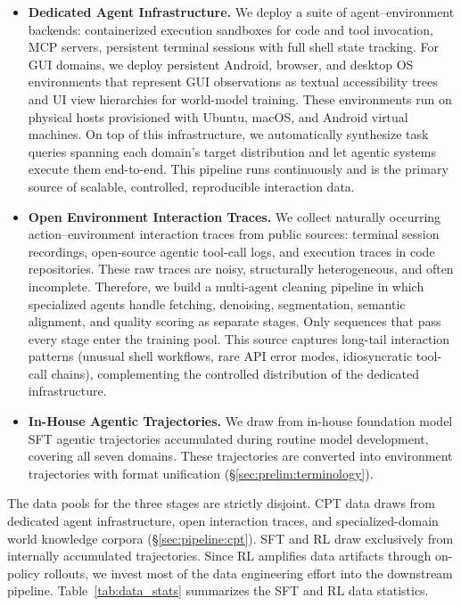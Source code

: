 \begin{itemize}[leftmargin=1.5em,itemsep=2pt]
\item \textbf{Dedicated Agent Infrastructure.}
We deploy a suite of agent--environment backends: containerized execution sandboxes for code and tool invocation, MCP servers, persistent terminal sessions with full shell state tracking.
For GUI domains, we deploy persistent Android, browser, and desktop OS environments that represent GUI observations as textual accessibility trees and UI view hierarchies for world-model training. These environments run on physical hosts provisioned with Ubuntu, macOS, and Android virtual machines.
On top of this infrastructure, we automatically synthesize task queries spanning each domain's target distribution and let agentic systems execute them end-to-end.
This pipeline runs continuously and is the primary source of scalable, controlled, reproducible interaction data.

\item \textbf{Open Environment Interaction Traces.}
We collect naturally occurring action--environment interaction traces from public sources:
terminal session recordings,
open-source agentic tool-call logs, and execution traces in code repositories.
These raw traces are noisy, structurally heterogeneous, and often incomplete.
Therefore, we build a multi-agent cleaning pipeline in which specialized agents handle fetching, denoising, segmentation, semantic alignment, and quality scoring as separate stages.
Only sequences that pass every stage enter the training pool.
This source captures long-tail interaction patterns (unusual shell workflows, rare API error modes, idiosyncratic tool-call chains), complementing the controlled distribution of the dedicated infrastructure.

\item \textbf{In-House Agentic Trajectories.}
We draw from in-house foundation model SFT agentic trajectories accumulated during routine model development, covering all seven domains.
These trajectories are converted into environment trajectories with format unification (\S\ref{sec:prelim:terminology}).
\end{itemize}

The data pools for the three stages are strictly disjoint.
CPT data draws from dedicated agent infrastructure, open interaction traces, and specialized-domain world knowledge corpora (\S\ref{sec:pipeline:cpt}).
SFT and RL draw exclusively from internally accumulated trajectories.
Since RL amplifies data artifacts through on-policy rollouts, we invest most of the data engineering effort into the downstream pipeline.
Table~\ref{tab:data_stats} summarizes the SFT and RL data statistics.

